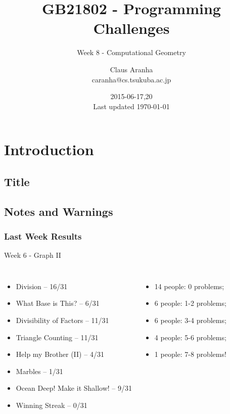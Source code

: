 \documentclass{beamer}
\title[GB21802]{GB21802 - Programming Challenges}
\subtitle[]{Week 8 - Computational Geometry}
\author[Claus Aranha]{Claus Aranha\\{\footnotesize caranha@cs.tsukuba.ac.jp}}
\institute{College of Information Science}
\date{2015-06-17,20\\{\tiny Last updated \today}}
\begin{document}
\section{Introduction}
\subsection{Title}
\begin{frame}
\maketitle
\end{frame}

\subsection{Notes and Warnings}

\begin{frame}
  \frametitle{Last Week Results}
  \begin{block}{Week 6 - Graph II}
    {\smaller
      \begin{columns}[T]
        \begin{itemize}
        \item Division -- 16/31
        \item What Base is This? -- 6/31
        \item Divisibility of Factors -- 11/31
        \item Triangle Counting -- 11/31
        \item Help my Brother (II) -- 4/31
        \item Marbles -- 1/31
        \item Ocean Deep! Make it Shallow! -- 9/31
        \item Winning Streak -- 0/31
        \end{itemize}
        \begin{itemize}
        \item  14 people: 0 problems; 
        \item  6 people: 1-2 problems;
        \item  6 people: 3-4 problems;
        \item  4 people: 5-6 problems;
        \item  1 people: 7-8 problems!
        \end{itemize}
      \end{columns}
    }
  \end{block}
\end{frame}
\end{document}
